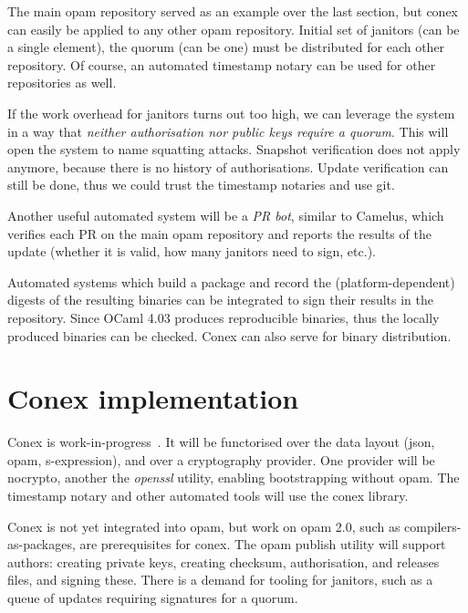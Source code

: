\documentclass[nocopyrightspace]{sigplanconf}
\newcommand{\TODO}[1]{\textbf{[TODO: #1]}}
\begin{document}
The main opam repository served as an example over the last section, but conex can easily be applied to any other opam repository.
Initial set of janitors (can be a single element), the quorum (can be one) must be distributed for each other repository.
Of course, an automated timestamp notary can be used for other repositories as well.

If the work overhead for janitors turns out too high, we can leverage the system in a way that \emph{neither authorisation nor public keys require a quorum}.
This will open the system to name squatting attacks.
Snapshot verification does not apply anymore, because there is no history of authorisations.
Update verification can still be done, thus we could trust the timestamp notaries and use git.


Another useful automated system will be a \emph{PR bot}, similar to Camelus, which verifies each PR on the main opam repository and reports the results of the update (whether it is valid, how many janitors need to sign, etc.).

Automated systems which build a package and record the (platform-dependent) digests of the resulting binaries can be integrated to sign their results in the repository.
Since OCaml 4.03 produces reproducible binaries, thus the locally produced binaries can be checked.
Conex can also serve for binary distribution.

\section{Conex implementation} \label{sec:implementation}

Conex is work-in-progress~\cite{conex}.
It will be functorised over the data layout (json, opam, s-expression), and over a cryptography provider.
One provider will be nocrypto, another the \emph{openssl} utility, enabling bootstrapping without opam.
The timestamp notary and other automated tools will use the conex library.

Conex is not yet integrated into opam, but work on opam 2.0, such as compilers-as-packages, are prerequisites for conex.
The opam publish utility will support authors: creating private keys, creating checksum, authorisation, and releases files, and signing these.
There is a demand for tooling for janitors, such as a queue of updates requiring signatures for a quorum.
\end{document}

